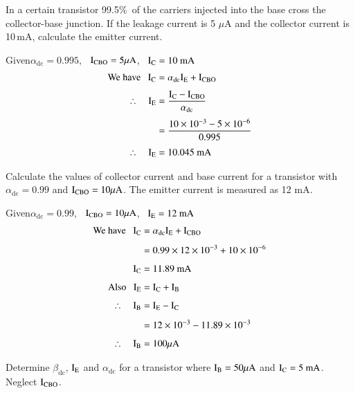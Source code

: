 \begin{problem}\label{prob2.3}
In a certain transistor 99.5\%\ of the carriers injected into the base cross the collector-base junction. If the leakage current is 5 $\mu$A and the collector current is 10\,mA, calculate the emitter current.
\end{problem}

\begin{solution}
Given\quad $\alpha_{\text{dc}}=0.995$, \ $\textrm{I}_{\text{CBO}}=5\mu\textrm{A}$, \ $\textrm{I}_{\textrm{C}}=10\text{~mA}$
\begin{align*}
\text{We have~~ } \textrm{I}_{\textrm{C}} &= \alpha_{\text{dc}}\textrm{I}_{\textrm{E}}+\textrm{I}_{\text{CBO}}\\[3pt]
\therefore\quad \textrm{I}_{\textrm{E}} &= \frac{\textrm{I}_{\textrm{C}}-\textrm{I}_{\text{CBO}}}{\alpha_{\text{dc}}}\\[3pt]
&= \frac{10\times 10^{-3}-5\times 10^{-6}}{0.995}\\[3pt]
\therefore\quad \textrm{I}_{\textrm{E}} &= 10.045\text{~mA}
\end{align*}
\end{solution}

\begin{problem}\label{prob2.4}
Calculate the values of collector current and base current for a transistor with $\alpha_{\text{dc}}=0.99$ and $\textrm{I}_{\text{CBO}}=10\mu\textrm{A}$. The emitter current is measured as 12 mA.
\end{problem}

\begin{solution}
Given\quad $\alpha_{\text{dc}}=0.99$, \ $\textrm{I}_{\text{CBO}}=10\mu\textrm{A}$, \ $\textrm{I}_{\textrm{E}}=12\text{~mA}$
\begin{align*}
\text{We have~~ } \textrm{I}_{\textrm{C}} &= \alpha_{\text{dc}}\textrm{I}_{\textrm{E}}+\textrm{I}_{\text{CBO}}\\[4pt]
&= 0.99\times 12\times 10^{-3}+10\times 10^{-6}\\[4pt]
\textrm{I}_{\textrm{C}} &= 11.89\text{~mA}\\[4pt]
\text{Also~~ } \textrm{I}_{\textrm{E}} &= \textrm{I}_{\textrm{C}}+\textrm{I}_{\textrm{B}}\\[4pt]
\therefore\quad \textrm{I}_{\textrm{B}} &= \textrm{I}_{\textrm{E}}- \textrm{I}_{\textrm{C}}\\[4pt]
&= 12\times 10^{-3}-11.89\times 10^{-3}\\[4pt]
\therefore\quad \textrm{I}_{\textrm{B}} &= 100\mu\textrm{A}
\end{align*}
\end{solution}

\begin{problem}\label{prob2.5}
Determine $\beta_{\text{dc}}$, $\textrm{I}_{\textrm{E}}$ and $\alpha_{\text{dc}}$ for a transistor where $\textrm{I}_{\textrm{B}}=50\mu\textrm{A}$ and $\textrm{I}_{\textrm{C}}=5\text{~mA}$. Neglect $\textrm{I}_{\text{CBO}}$.
\end{problem}

